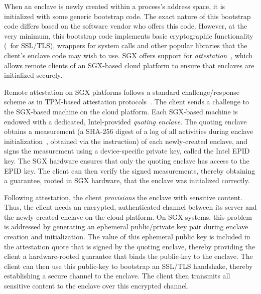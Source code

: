 %
When an enclave is newly created within a process's address space, it is
initialized with some generic bootstrap code. The exact nature of this
bootstrap code differs based on the software vendor who offers this code.
However, at the very minimum, this bootstrap code implements basic cryptographic
functionality (\eg~for SSL/TLS), wrappers for system calls and other popular
libraries that the client's enclave code may wish to use.  SGX offers support
for \textit{attestation}~\cite{sgx:attest:hasp13}, which allows remote clients
of an SGX-based cloud platform to ensure that enclaves are initialized
securely. 

Remote attestation on SGX platforms follows a standard challenge/response
scheme as in TPM-based attestation protocols~\cite{sailer:tpm:security04}. The
client sends a challenge to the SGX-based machine on the cloud platform.  Each
SGX-based machine is endowed with a dedicated, Intel-provided \textit{quoting
enclave}. The quoting enclave obtains a measurement (a SHA-256 digest of a log
of all activities during enclave initialization~\cite{sgx:attest:hasp13},
obtained via the  instruction) of each newly-created enclave, and
signs the measurement using a device-specific private key, called the Intel
EPID key. The SGX hardware ensures that only the quoting enclave has access to
the EPID key.  The client can then verify the signed measurements, thereby
obtaining a guarantee, rooted in SGX hardware, that the enclave was initialized
correctly.

Following attestation, the client \textit{provisions} the enclave with
sensitive content. Thus, the client needs an encrypted, authenticated channel
between its server and the newly-created enclave on the cloud platform. On SGX
systems, this problem is addressed by generating an ephemeral public/private
key pair during enclave creation and initialization. The value of this
ephemeral public key is included in the attestation quote that is signed by the
quoting enclave, thereby providing the client a hardware-rooted guarantee that
binds the public-key to the enclave.  The client can then use this public-key
to bootstrap an SSL/TLS handshake, thereby establishing a secure channel to the
enclave. The client then transmits all sensitive content to the enclave over
this encrypted channel.


